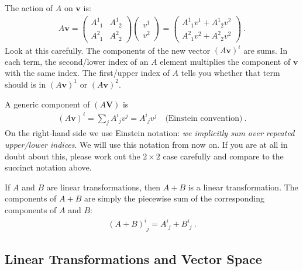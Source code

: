\documentclass[12pt]{article}
\numberwithin{equation}{section}    %
\renewcommand{\vec}[1]{\mathbf{#1}} %
\begin{document}
The action of $A$ on $\vec{v}$ is:
\begin{align}
  A\vec{v}
  =
  \begin{pmatrix}
    A^{1}_{\phantom{1}1} & A^{1}_{\phantom{1}2}
   \\
   A^{2}_{\phantom{2}1} & A^{2}_{\phantom{2}2}   
  \end{pmatrix} 
  \begin{pmatrix}
    v^1\\
    v^2
  \end{pmatrix}
  =
  \begin{pmatrix}
    A^1_{\phantom{1}1} v^1 + A^1_{\phantom{1}2}v^2\\
    A^2_{\phantom{2}1} v^2 + A^2_{\phantom{2}2}v^2
  \end{pmatrix} \ .
\end{align}
Look at this carefully. The components of the new vector $(A \vec{v})^i$ are sums. In each term, the second/lower index of an $A$ element multiplies the component of $\vec{v}$ with the same index. The first/upper index of $A$ tells you whether that term should is in $(A \vec{v})^1$ or $(A \vec{v})^2$. 

A generic component of $(A\vec{V})$ is
\begin{align}
  (A\vec{v})^i = \sum_j A^i_{\phantom{i}j} v^j
  = A^i_{\phantom{i}j} v^j \quad \text{(Einstein convention)}
   \ .
\end{align}
On the right-hand side we use Einstein notation: \emph{we implicitly sum over repeated upper/lower indices}. We will use this notation from now on.
%
If you are at all in doubt about this, please work out the $2\times 2$ case carefully and compare to the succinct notation above. 


If $A$ and $B$ are linear transformations, then $A+B$ is a linear transformation. The components of $A+B$ are simply the piecewise sum of the corresponding components of $A$ and $B$:
\begin{align}
  (A+B)^i_{\phantom i j} = A^i_{\phantom i j} + B ^i_{\phantom i j} \ .
\end{align}

\subsection{Linear Transformations and Vector Space}
\end{document}

